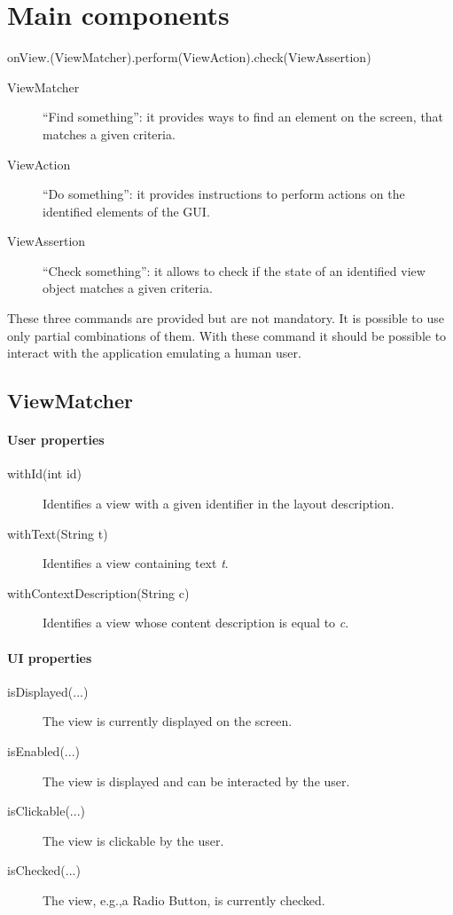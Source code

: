\section{Main components}
onView.(ViewMatcher).perform(ViewAction).check(ViewAssertion)

\begin{description}
\item [ViewMatcher] ``Find something'': it provides ways to find an element on the screen, that matches a given criteria.
\item [ViewAction] ``Do something'': it provides instructions to perform actions on the identified elements of the GUI.
\item [ViewAssertion] ``Check something'': it allows to check if the state of an identified view object matches a given criteria.
\end{description}
These three commands are provided but are not mandatory. It is possible to use only partial combinations of them. With these command it should be possible to interact with the application emulating a human user.

\subsection{ViewMatcher}
\paragraph{User properties}
\begin{description}
\item [withId(int id)] Identifies a view with a given identifier in the layout description.
\item [withText(String t)] Identifies a view containing text \emph{t}.
\item [withContextDescription(String c)] Identifies a view whose content description is equal to \emph{c}.
\end{description}

\paragraph{UI properties}
\begin{description}
\item [isDisplayed(...)] The view is currently displayed on the screen.
\item [isEnabled(...)] The view is displayed and can be interacted by the user.
\item [isClickable(...)] The view is clickable by the user.
\item [isChecked(...)] The view, e.g.,\@ a Radio Button, is currently checked. 
\end{description}

